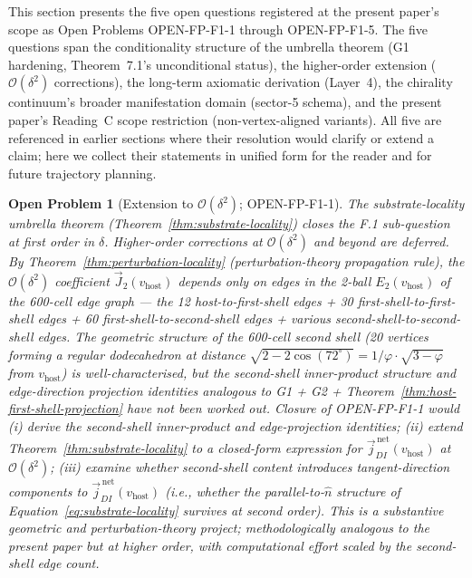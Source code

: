\documentclass[11pt,letterpaper]{article}
\newtheorem{openproblem}{Open Problem}
\newcommand{\phig}{\varphi}
\newcommand{\vhost}{v_{\text{host}}}
\newcommand{\jDInet}{\vec{j}_{DI}^{\,\text{net}}}
\newcommand{\bigO}[1]{\mathcal{O}(#1)}
\begin{document}

This section presents the five open questions registered at the present paper's scope as Open Problems OPEN-FP-F1-1 through OPEN-FP-F1-5. The five questions span the conditionality structure of the umbrella theorem (G1 hardening, Theorem~7.1's unconditional status), the higher-order extension ($\bigO{\delta^2}$ corrections), the long-term axiomatic derivation (Layer~4), the chirality continuum's broader manifestation domain (sector-5 schema), and the present paper's Reading~C scope restriction (non-vertex-aligned variants). All five are referenced in earlier sections where their resolution would clarify or extend a claim; here we collect their statements in unified form for the reader and for future trajectory planning.

\begin{openproblem}[Extension to $\bigO{\delta^2}$; OPEN-FP-F1-1]
\label{op:delta-squared}
The substrate-locality umbrella theorem (Theorem~\ref{thm:substrate-locality}) closes the F.1 sub-question at first order in $\delta$. Higher-order corrections at $\bigO{\delta^2}$ and beyond are deferred. By Theorem~\ref{thm:perturbation-locality} (perturbation-theory propagation rule), the $\bigO{\delta^2}$ coefficient $\vec{J}_2(\vhost)$ depends only on edges in the 2-ball $E_2(\vhost)$ of the 600-cell edge graph --- the 12 host-to-first-shell edges + 30 first-shell-to-first-shell edges + 60 first-shell-to-second-shell edges + various second-shell-to-second-shell edges. The geometric structure of the 600-cell second shell (20 vertices forming a regular dodecahedron at distance $\sqrt{2 - 2 \cos(72^\circ)} = 1/\phig \cdot \sqrt{3 - \phig}$ from $\vhost$) is well-characterised, but the second-shell inner-product structure and edge-direction projection identities analogous to G1 + G2 + Theorem~\ref{thm:host-first-shell-projection} have not been worked out. Closure of OPEN-FP-F1-1 would (i) derive the second-shell inner-product and edge-projection identities; (ii) extend Theorem~\ref{thm:substrate-locality} to a closed-form expression for $\jDInet(\vhost)$ at $\bigO{\delta^2}$; (iii) examine whether second-shell content introduces tangent-direction components to $\jDInet(\vhost)$ (i.e., whether the parallel-to-$\hat{n}$ structure of Equation~\eqref{eq:substrate-locality} survives at second order). This is a substantive geometric and perturbation-theory project; methodologically analogous to the present paper but at higher order, with computational effort scaled by the second-shell edge count.
\end{openproblem}
\end{document}
